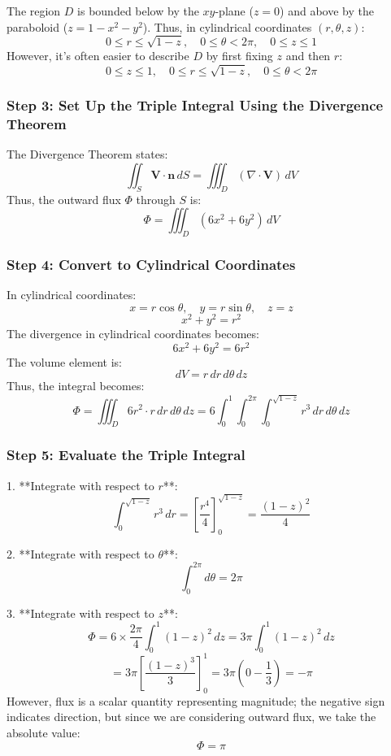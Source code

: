 \documentclass[11pt]{article}
\begin{document}
The region \( D \) is bounded below by the \( xy \)-plane (\( z = 0 \)) and above by the paraboloid (\( z = 1 - x^2 - y^2 \)). Thus, in cylindrical coordinates \((r, \theta, z)\):
\[
0 \leq r \leq \sqrt{1 - z}, \quad 0 \leq \theta < 2\pi, \quad 0 \leq z \leq 1
\]
However, it's often easier to describe \( D \) by first fixing \( z \) and then \( r \):
\[
0 \leq z \leq 1, \quad 0 \leq r \leq \sqrt{1 - z}, \quad 0 \leq \theta < 2\pi
\]

\subsubsection*{Step 3: Set Up the Triple Integral Using the Divergence Theorem}

The Divergence Theorem states:
\[
\iint_{S} \mathbf{V} \cdot \mathbf{n} \, dS = \iiint_{D} (\nabla \cdot \mathbf{V}) \, dV
\]
Thus, the outward flux \( \Phi \) through \( S \) is:
\[
\Phi = \iiint_{D} (6x^2 + 6y^2) \, dV
\]

\subsubsection*{Step 4: Convert to Cylindrical Coordinates}

In cylindrical coordinates:
\[
x = r \cos\theta, \quad y = r \sin\theta, \quad z = z
\]
\[
x^2 + y^2 = r^2
\]
The divergence in cylindrical coordinates becomes:
\[
6x^2 + 6y^2 = 6r^2
\]
The volume element is:
\[
dV = r \, dr \, d\theta \, dz
\]
Thus, the integral becomes:
\[
\Phi = \iiint_{D} 6r^2 \cdot r \, dr \, d\theta \, dz = 6 \int_{0}^{1} \int_{0}^{2\pi} \int_{0}^{\sqrt{1 - z}} r^3 \, dr \, d\theta \, dz
\]

\subsubsection*{Step 5: Evaluate the Triple Integral}

1. **Integrate with respect to $r$**:
\[
\int_{0}^{\sqrt{1 - z}} r^3 \, dr = \left[ \frac{r^4}{4} \right]_{0}^{\sqrt{1 - z}} = \frac{(1 - z)^2}{4}
\]

2. **Integrate with respect to $\theta$**:
\[
\int_{0}^{2\pi} d\theta = 2\pi
\]

3. **Integrate with respect to $z$**:
\[
\Phi = 6 \times \frac{2\pi}{4} \int_{0}^{1} (1 - z)^2 \, dz = 3\pi \int_{0}^{1} (1 - z)^2 \, dz
\]
\[
= 3\pi \left[ \frac{(1 - z)^3}{3} \right]_{0}^{1} = 3\pi \left( 0 - \frac{1}{3} \right ) = -\pi
\]
However, flux is a scalar quantity representing magnitude; the negative sign indicates direction, but since we are considering outward flux, we take the absolute value:
\[
\Phi = \pi
\]
\end{document}
